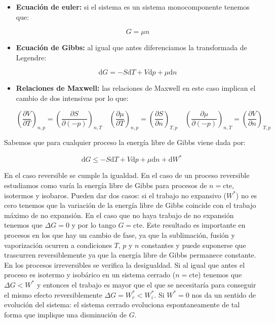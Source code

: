 \documentclass[12pt,a4paper]{article}
\newcommand{\D}{\mathrm{d}}
\newcommand{\cte}{\mathrm{cte}}
\newcommand{\parentesis}[1]{\left( #1 \right)}
\newcommand{\parciales}[2]{\frac{\partial #1}{\partial #2}}
\begin{document}
\begin{itemize}
\item \textbf{Ecuación de euler:} si el sistema es un sistema monocomponente tenemos que:

\begin{equation}
G = \mu n
\end{equation}

\item  \textbf{Ecuación de Gibbs:} al igual que antes diferenciamos la transformada de Legendre:

\begin{equation}
\D G = - S \D T + V \D p + \mu \D n
\end{equation}

\item \textbf{Relaciones de Maxwell:} las relaciones de Maxwell en este caso implican el cambio de dos intensivas por lo que:

\begin{equation}
\parentesis{\parciales{V}{T}}_{n,p} = \parentesis{\parciales{S}{(-p)}}_{n,T} \quad \parentesis{\parciales{\mu}{T}}_{n,p} = \parentesis{\parciales{S}{n}}_{T,p} \quad \parentesis{\parciales{\mu}{(-p)}}_{n,T} = \parentesis{\parciales{V}{n}}_{T,p}
\end{equation}

\end{itemize}

Sabemos que para cualquier proceso la energía libre de Gibbs viene dada por:

\begin{equation}
\D G \leq - S \D T + V \D p + \mu \D n + \D W^*
\end{equation}

En el caso reversible se cumple la igualdad. En el caso de un proceso reversible estudiamos como varía la energía libre de Gibbs para procesos de $n=\cte$, isotermos y isobaros. Pueden dar dos casos: si el trabajo no expansivo ($W^*$) no es cero tenemos que la variación de la energía libre de Gibbs coincide con el trabajo máximo de no expansión. En el caso que no haya trabajo de no expansión tenemos que $\Delta G = 0$ y por lo tango $G=\cte$. Este resultado es importante en procesos en los que hay un cambio de fase, ya que la sublimación, fusión y vaporización ocurren a condiciones $T$, $p$ y $n$ constantes y puede suponerse que trascurren reversiblemente ya que la energía libre de Gibbs permanece constante. \\

En los procesos irreversibles se verifica la desigualdad. Si al igual que antes el proceso es isotermo y isobárico en un sistema cerrado ($n=\cte$) tenemos que $\Delta G < W^*$ y entonces el trabajo es mayor que el que se necesitaría para conseguir el mismo efecto reversiblemente $\Delta G = W^*_{r} < W_{i}^*$. Si $W^*=0$ nos da un sentido de evolución del sistema: el sistema cerrado evoluciona espontaneamente de tal forma que implique una disminución de $G$. 
\end{document}
